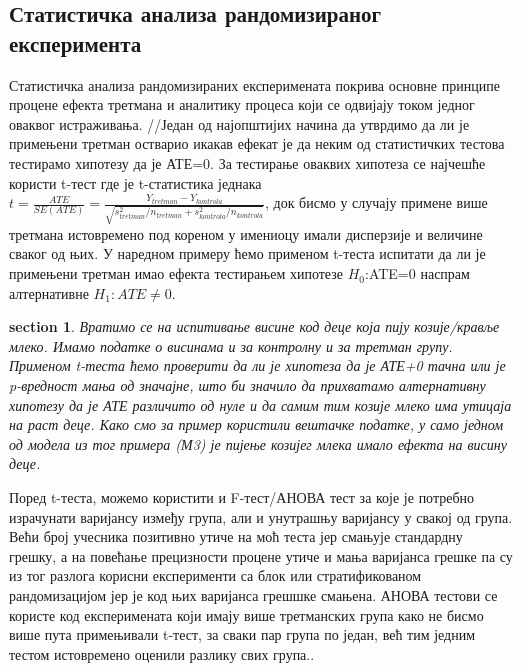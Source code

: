 \documentclass[12pt, a4paper]{article}
\newtheorem{primer}[Пример]{section}
\begin{document}
\subsection{Статистичка анализа рандомизираног експеримента}

Статистичка анализа рандомизираних експеримената покрива основне принципе процене ефекта третмана 
и аналитику процеса који се одвијају током једног оваквог истраживања.
//Један од најопштијих начина да утврдимо да ли је примењени третман остварио икакав ефекат је да 
неким од статистичких тестова тестирамо хипотезу да је АТЕ=0. За тестирање оваквих хипотеза се 
најчешће користи t-тест где је t-статистика једнака 
$t=\frac{ATE}{SE(ATE)}=\frac{Y_{tretman}-Y_{kontrola}}{\sqrt{s_{tretman}^2/n_{tretman}+s_{kontrola}^2/n_{kontrola}}}$, 
док бисмо у случају примене више третмана истовремено под кореном у имениоцу имали дисперзије и 
величине сваког од њих. У наредном примеру ћемо применом t-теста испитати да ли је примењени 
третман имао ефекта тестирањем хипотезе $H_0$:ATE=0 наспрам алтернативне $H_1:ATE\neq0$.

\begin{primer}
Вратимо се на испитивање висине код деце која пију козије/кравље млеко. Имамо податке о висинама и 
за контролну и за третман групу. Применом t-теста ћемо проверити да ли је хипотеза да је АТЕ+0 
тачна или је p-вредност мања од значајне, што би значило да прихватамо алтернативну хипотезу 
да је АТЕ различито од нуле и да самим тим козије млеко има утицаја на раст деце. Како смо за пример 
користили вештачке податке, у само једном од модела из тог примера (М3) је пијење козијег млека 
имало ефекта на висину деце.
\end{primer}

Поред t-теста, можемо користити и F-тест/АНОВА тест за које је потребно израчунати варијансу 
између група, али и унутрашњу варијансу у свакој од група. Већи број учесника позитивно утиче на 
моћ теста јер смањује стандардну грешку, а на повећање прецизности процене утиче и мања варијанса 
грешке па су из тог разлога корисни експерименти са блок или стратификованом рандомизацијом јер 
је код њих варијанса грешшке смањена. АНОВА тестови се користе код експеримената који имају више 
третманских група како не бисмо више пута примењивали t-тест, за сваки пар група по један, већ 
тим једним тестом истовремено оценили разлику свих група..
\end{document}
